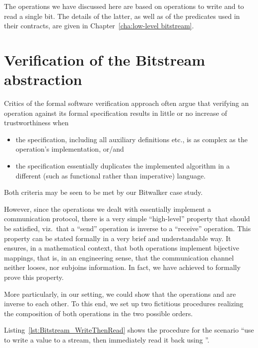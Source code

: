 The operations we have discussed here are based
on operations to write and to read a single bit.
%
The details of the latter, as well as of the predicates used in their
contracts, are given in Chapter~\ref{cha:low-level bitstream}.

\FloatBarrier


\section{Verification of the Bitstream abstraction}
\label{sec:bitstream verif}



Critics of the formal software verification approach often 
argue that verifying an operation against its formal specification
results in little or no increase of trustworthiness when
%
\begin{itemize}
\item the specification, including all auxiliary definitions etc., is
	as complex as the operation's implementation, or/and
\item the specification essentially duplicates the implemented
	algorithm in a different (such as functional rather than
	imperative) language.
\end{itemize}
%
Both criteria may be seen to be met by our Bitwalker case study.



However, since the operations we dealt with essentially implement a
communication protocol, there is a very simple ``high-level'' property
that should be satisfied, viz.\ that a ``send'' operation is inverse
to a ``receive'' operation.
%
This property can be stated formally in a very brief and understandable
way.
%
It ensures, in a mathematical context, that both operations implement
bijective mappings, that is, in an engineering sense, that the
communication channel neither looses, nor subjoins information.
%
In fact, we have achieved to formally prove this property.




More particularly, in our setting, we could show that the operations
 and  are
inverse to each other.
%
To this end, we set up two fictitious \isoc procedures realizing
the composition of both operations in the two possible orders.




Listing~\ref{lst:Bitstream_WriteThenRead}
shows the procedure for the scenario ``use 
to write a value to a stream, then immediately read it back using
''.


